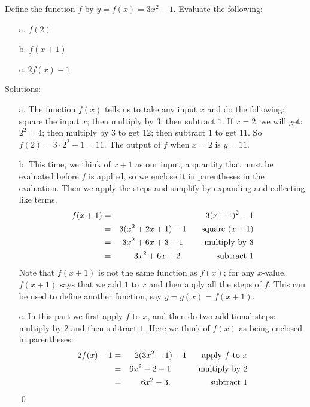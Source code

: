 \begin{eg} Define the function $f$ by $y = f(x) = 3x^2-1$. Evaluate the following:
\begin{enumerate}
\item[a.] $f(2)$ 
\item[b.] $f(x+1)$ 
\item[c.] $2f(x) -1$
\end{enumerate}
\underline{Solutions:}
\begin{enumerate}
\item[a.]  The function $f(x)$ tells us to take any input $x$ and do the following:  square the input $x$; then multiply by $3$; then subtract $1$.  If $x=2$, we will get:  $2^2 = 4$;  then multiply by $3$ to get $12$; then subtract $1$ to get $11$.  So  $f(2) = 3\cdot 2^2 -1 = 11$.  The output of $f$ when $x=2$ is $y = 11$.
\item[b.] This time,  we think of $x+1$ as our input, a quantity that must be evaluated before $f$ is applied, so we enclose it in parentheses in the evaluation. Then we apply the steps and simplify by expanding and collecting like terms.
\begin{eqnarray*}
f(x+1) & = & 3(x+1)^2 - 1\\
 & = & 3(x^2+2x+1) - 1   \phantom{ww} \textup{ square } (x+1) \\
 & = & 3x^2+6x +3 - 1   \phantom{www} \textup{ multiply by  } 3 \\
  & = & 3x^2+6x + 2.   \phantom{wwwww} \textup{ subtract } 1 \\
\end{eqnarray*}
Note that $f(x+1)$ is not the same function as $f(x)$; for any $x$-value, $f(x+1)$ says that we add $1$ to $x$ and then apply all the steps of $f$.   This can be used to define another function, say $y = g(x) = f(x+1)$.
\item[c.] In this part we first apply $f$ to $x$, and then do two additional steps:   multiply by $2$ and then subtract $1$. Here we think of $f(x)$ as being enclosed in parentheses:
\begin{eqnarray*}
2f(x) - 1 & = & 2(3x^2-1) -1   \phantom{ww} \textup{ apply  } f \textup{ to } x \\
 & = & 6x^2-2-1   \phantom{wwww} \textup{ multiply by  } 2 \\ 
  & = & 6x^2-3.   \phantom{wwwwww} \textup{ subtract   } 1\\
\end{eqnarray*}\qed 
\end{enumerate}
\end{eg}
\par

